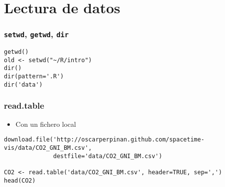 \documentclass[xcolor={usenames,svgnames,dvipsnames}]{beamer}
\begin{document}
\section{Lectura de datos}
\label{sec-2}
\begin{frame}[fragile]
\frametitle{\texttt{setwd}, \texttt{getwd}, \texttt{dir}}
\label{sec-2-1}


\lstset{language=R}
\begin{lstlisting}
getwd()
old <- setwd("~/R/intro")
dir()
dir(pattern='.R')
dir('data')
\end{lstlisting}
\end{frame}
\begin{frame}[fragile]
\frametitle{read.table}
\label{sec-2-2}

\begin{itemize}
\item Con un fichero local
\end{itemize}

\lstset{language=R}
\begin{lstlisting}
download.file('http://oscarperpinan.github.com/spacetime-vis/data/CO2_GNI_BM.csv',
              destfile='data/CO2_GNI_BM.csv')

CO2 <- read.table('data/CO2_GNI_BM.csv', header=TRUE, sep=',')
head(CO2)
\end{lstlisting}



\end{frame}
\end{document}
